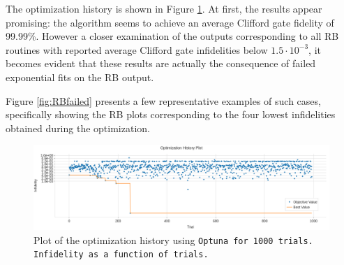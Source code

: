 The optimization history is shown in Figure \ref{fig:optuna1000beta:optimization}. 
At first, the results appear promising: the algorithm seems to achieve an average Clifford gate fidelity of 99.99\%. 
However a closer examination of the outputs corresponding to all RB routines with reported average Clifford gate infidelities below $1.5 \cdot 10^{-3}$, it becomes evident that these results are actually the consequence of failed exponential fits on the RB output.

Figure \ref{fig:RBfailed} presents a few representative examples of such cases, specifically showing the RB plots corresponding to the four lowest infidelities obtained during the optimization.

\begin{figure}[h!]
    \centering
    \includegraphics[width=\textwidth]{figures/png/RB_optimization/Optuna/1000beta/optimization.png}
    \caption{Plot of the optimization history using \tt{Optuna} for 1000 trials. Infidelity as a function of trials.}
    \label{fig:optuna1000beta:optimization}
\end{figure}

